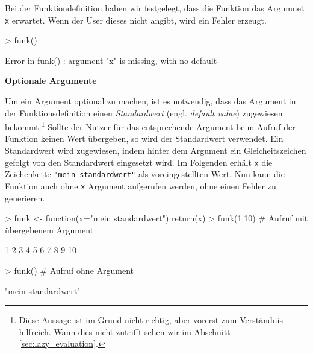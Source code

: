 \documentclass[12pt, a4paper,twoside,openany,x11names,svgnames]{memoir}
\begin{document}
Bei der Funktiondefinition haben wir festgelegt, dass die Funktion das Argumnet \texttt{x} erwartet. Wenn der User dieses nicht angibt, wird ein Fehler erzeugt.

\begin{Schunk}
\begin{Sinput}
> funk()
\end{Sinput}
\end{Schunk}
\vspace{-8mm}
\begin{Schunk}
\begin{Soutput}
Error in funk() : argument "x" is missing, with no default
\end{Soutput}
\end{Schunk}

\vspace*{5mm}

\textbf{Optionale Argumente} 

Um ein Argument optional zu machen, ist es notwendig, dass das Argument in der Funktionsdefinition einen \emph{Standardwert} (engl. \emph{default value}) zugewiesen bekommt.\footnote{Diese Aussage ist im Grund nicht richtig, aber vorerst zum Verständnis hilfreich. Wann dies nicht zutrifft sehen wir im Abschnitt  \ref{sec:lazy_evaluation}.} Sollte der Nutzer für das entsprechende Argument beim Aufruf der Funktion keinen Wert übergeben, so wird der Standardwert verwendet. Ein Standardwert wird zugewiesen, indem hinter dem Argument ein Gleicheitszeichen gefolgt von den Standardwert eingesetzt wird. Im Folgenden erhält \texttt{x} die Zeichenkette \texttt{"mein standardwert"} als voreingestellten Wert. Nun kann die Funktion auch ohne \texttt{x} Argument aufgerufen werden, ohne einen Fehler zu generieren.

\begin{Schunk}
\begin{Sinput}
> funk <- function(x="mein standardwert"){
   return(x)
 }
> funk(1:10)               # Aufruf mit übergebenem Argument
\end{Sinput}
\begin{Soutput}
 [1]  1  2  3  4  5  6  7  8  9 10
\end{Soutput}
\begin{Sinput}
> funk()                   # Aufruf ohne Argument
\end{Sinput}
\begin{Soutput}
[1] "mein standardwert"
\end{Soutput}
\end{Schunk}
\end{document}
